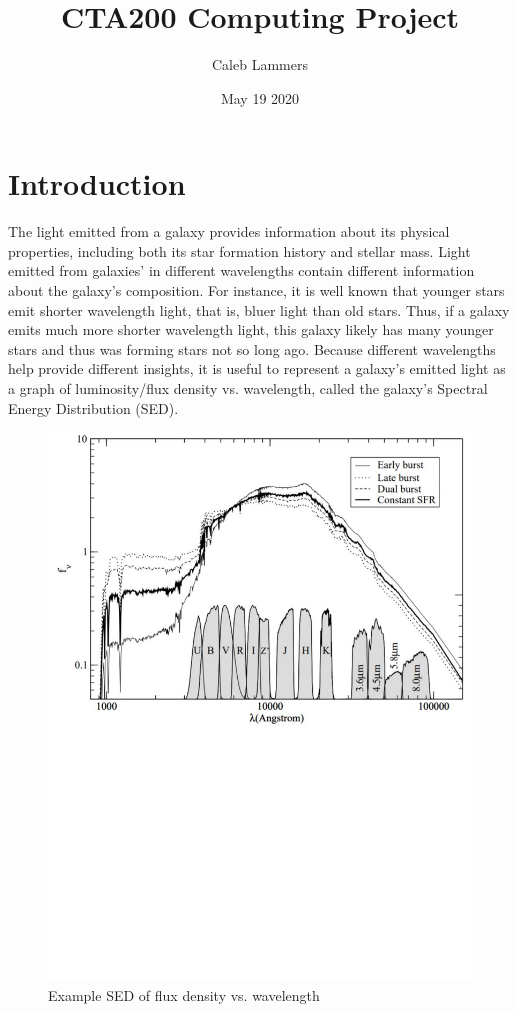 \documentclass{article}
\title{CTA200 Computing Project}
\author{Caleb Lammers}
\date{May 19 2020}
\begin{document}
\maketitle

\section*{Introduction}

The light emitted from a galaxy provides information about its physical properties, including both
its star formation history and stellar mass. Light emitted from galaxies' in different wavelengths
contain different information about the galaxy's composition. For instance, it is well known that
younger stars emit shorter wavelength light, that is, bluer light than old stars. Thus, if a galaxy
emits much more shorter wavelength light, this galaxy likely has many younger stars and thus was forming
stars not so long ago. Because different wavelengths help provide different insights, it is useful
to represent a galaxy's emitted light as a graph of luminosity/flux density vs. wavelength, called
the galaxy's Spectral Energy Distribution (SED).

\begin{figure}[h]
  \centering
\includegraphics[scale=0.4]{SED Example}
\caption{Example SED of flux density vs. wavelength}
\end{figure}
\end{document}
